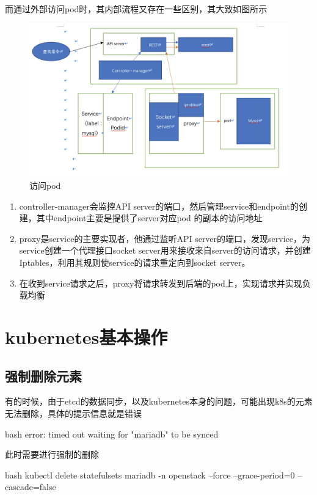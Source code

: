 而通过外部访问pod时，其内部流程又存在一些区别，其大致如图所示
\begin{figure}[H]
    \centering
    \includegraphics[width=\linewidth]{visit_pod.png}
    \caption{访问pod}
    \label{fig:visit_pod}
\end{figure}
\begin{enumerate}
    \item controller-manager会监控API server的端口，然后管理service和endpoint的创建，其中endpoint主要是提供了server对应pod 的副本的访问地址
    \item proxy是service的主要实现者，他通过监听API server的端口，发现service，为service创建一个代理接口socket server用来接收来自server的访问请求，并创建Iptables，利用其规则使service的请求重定向到socket server。
    \item 在收到service请求之后，proxy将请求转发到后端的pod上，实现请求并实现负载均衡
\end{enumerate}

\section{kubernetes基本操作}

\subsection{强制删除元素}
有的时候，由于etcd的数据同步，以及kubernetes本身的问题，可能出现k8s的元素无法删除，具体的提示信息就是错误
\begin{code-block}{bash}
error: timed out waiting for "mariadb" to be synced
\end{code-block}

此时需要进行强制的删除
\begin{code-block}{bash}
kubectl delete statefulsets mariadb -n openstack  --force --grace-period=0 --cascade=false
\end{code-block}

